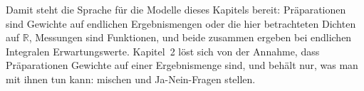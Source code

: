 Damit steht die Sprache für die Modelle dieses Kapitels bereit: Präparationen sind
Gewichte auf endlichen Ergebnismengen oder die hier betrachteten Dichten auf $\mathbb{R}$,
Messungen sind Funktionen, und beide zusammen ergeben bei endlichen Integralen
Erwartungswerte. Kapitel~2 löst sich von der
Annahme, dass Präparationen Gewichte auf einer Ergebnismenge sind, und behält nur, was
man mit ihnen tun kann: mischen und Ja-Nein-Fragen stellen.
